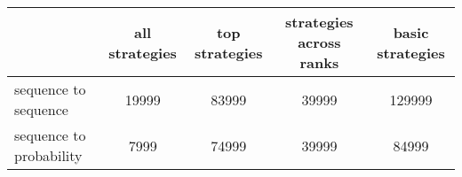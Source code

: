 \begin{tabular}{lcccc}
\toprule
{} &  all strategies &  top strategies &  strategies across ranks &  basic strategies \\
\midrule
sequence to sequence    &           19999 &           83999 &                    39999 &            129999 \\
sequence to probability &            7999 &           74999 &                    39999 &             84999 \\
\bottomrule
\end{tabular}
